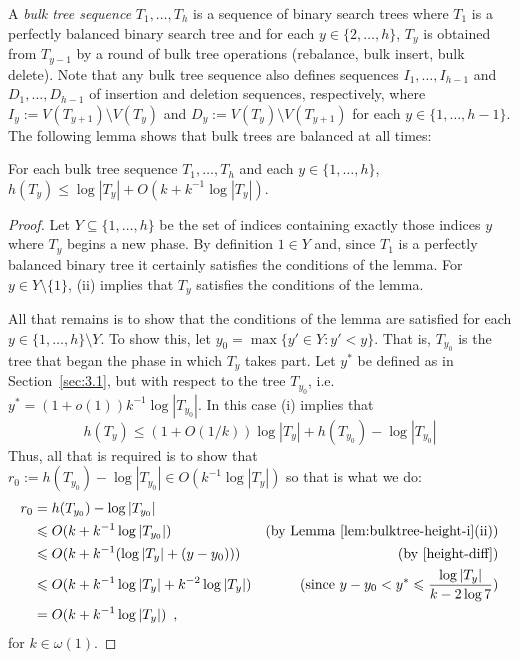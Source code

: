 \documentclass[kpfonts]{patmorin}
\newcommand{\snote}[1]{\fcolorbox{red}{yellow}{#1}}
\let\le\leqslant
\begin{document}
A \emph{bulk tree sequence} $T_1,\ldots,T_h$ is a sequence of binary search trees where $T_1$ is a perfectly balanced binary search tree and for each $y\in\{2,\ldots,h\}$, $T_y$ is obtained from $T_{y-1}$ by a round of bulk tree operations (rebalance, bulk insert, bulk delete).  Note that any bulk tree sequence also defines sequences $I_1,\ldots,I_{h-1}$ and $D_1,\ldots,D_{h-1}$ of insertion and deletion sequences, respectively, where $I_y:=V(T_{y+1})\setminus V(T_y)$ and $D_y:=V(T_{y})\setminus V(T_{y+1})$ for each $y\in\{1,\ldots,h-1\}$. 
The following lemma shows that bulk trees are balanced at all times:
\begin{lem}
  For each bulk tree sequence $T_1,\ldots,T_h$ and each $y\in\{1,\ldots,h\}$,  $h(T_y)\le \log|T_y| + O(k+k^{-1}\log|T_y|)$.
\end{lem}

\begin{proof}
  Let $Y\subseteq\{1,\ldots,h\}$ be the set of indices containing exactly those indices $y$ where $T_y$ begins a new phase. By definition $1\in Y$ and, since $T_1$ is a perfectly balanced binary tree it certainly satisfies the conditions of the lemma.  For $y\in Y\setminus\{1\}$, 
  (ii) implies that $T_y$ satisfies the conditions of the lemma.  
  
  All that remains is to show that the conditions of the lemma are satisfied for each $y\in\{1,\ldots,h\}\setminus Y$. To show this, let $y_0=\max\{ y'\in Y: y'<y\}$.  That is, $T_{y_0}$ is the tree that began the phase in which $T_y$ takes part.  Let $y^*$ be defined as in Section~\ref{sec:3.1}, but with respect to the tree $T_{y_0}$, i.e.\ $y^*=(1+o(1))k^{-1}\log |T_{y_0}|$. In this case (i) implies that
  \[  h(T_y) \le (1+O(1/k))\log |T_y| + h(T_{y_0})-\log|T_{y_0}| \]  
  Thus, all that is required is to show that $r_0:=h(T_{y_0})-\log|T_{y_0}|\in O(k^{-1}\log|T_y|)$ so that is what we do:
  \begin{align*}
    r_0 &= h(T_{y_0})-\log|T_{y_0}| \\
       &\le O(k + k^{-1}\log|T_{y_0}|) 
        & \text{(by \lemref{bulktree-height-i}(ii))}\\
       &\le O(k + k^{-1}(\log|T_{y}| + (y-y_0))) 
        & \text{(by \eqref{height-diff})} \\
       &\le O(k + k^{-1}\log|T_{y}| + k^{-2}\log|T_y|) 
        & \text{(since $y-y_0 < y^*\le \frac{\log|T_y|}{k-2\log 7}$)}\\
       &= O(k + k^{-1}\log|T_{y}|) \enspace ,
  \end{align*}
  for $k\in\omega(1)$. 
\end{proof}
\end{document}
